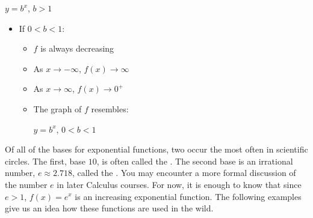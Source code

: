 {\begin{multicols}{2}
\begin{itemize}
\begin{itemize}
\begin{center}
$y = b^{x}$, $b > 1$
\end{center}

\end{itemize}

\end{itemize}


\begin{itemize}

\item  If $0<b<1$:

\begin{itemize}

\item  $f$ is always decreasing

\item  As $x \rightarrow -\infty$, $f(x) \rightarrow \infty$

\item  As $x \rightarrow \infty$, $f(x) \rightarrow 0^{+}$

\item  The graph of $f$ resembles:

\begin{center}

$y = b^{x}$, $0 < b < 1$
\end{center}

\end{itemize}

\end{itemize} 

\end{multicols}
}

\smallskip

Of all of the bases for exponential functions, two occur the most often in scientific circles.  The first, base $10$, is often called the .  The second base is an irrational number, $e \approx 2.718$, called the .  You may encounter a more formal discussion of the number $e$ in later Calculus courses. For now, it is enough to know that since $e > 1$, $f(x) = e^{x}$ is an increasing exponential function.  The following examples give us an idea how these functions are used in the wild.

\medskip


